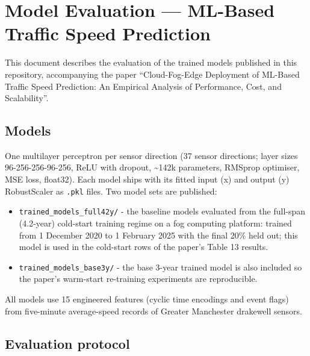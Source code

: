 \documentclass[
  10pt, ]{article}
\author{}
\date{}
\providecommand{\tightlist}{%
  \setlength{\itemsep}{0pt}\setlength{\parskip}{0pt}}
\begin{document}
\hypertarget{model-evaluation-ml-based-traffic-speed-prediction}{%
\section{Model Evaluation --- ML-Based Traffic Speed
Prediction}\label{model-evaluation-ml-based-traffic-speed-prediction}}

This document describes the evaluation of the trained models published in this repository, accompanying the paper ``Cloud-Fog-Edge Deployment of ML-Based Traffic Speed Prediction: An Empirical Analysis of Performance, Cost, and Scalability''.

\hypertarget{models}{%
\subsection{Models}\label{models}}

One multilayer perceptron per sensor direction (37 sensor directions; layer sizes 96-256-256-96-256, ReLU with dropout, \textasciitilde142k parameters, RMSprop optimiser, MSE loss, float32). Each model ships with its fitted input (x) and output (y) RobustScaler as \texttt{.pkl} files. Two model sets are published:

\begin{itemize}
\tightlist
\item
  \texttt{trained\_models\_full42y/} - the baseline models evaluated from the full-span (4.2-year) cold-start training regime on a fog computing platform: trained from 1 December 2020 to 1 February 2025 with the final 20\% held out; this model is used in the cold-start rows of the paper's Table 13 results.
\item
  \texttt{trained\_models\_base3y/} - the base 3-year trained model is also included so the paper's warm-start re-training experiments are reproducible.
\end{itemize}

All models use 15 engineered features (cyclic time encodings and event flags) from five-minute average-speed records of Greater Manchester drakewell sensors.

\hypertarget{evaluation-protocol}{%
\subsection{Evaluation protocol}\label{evaluation-protocol}}
\end{document}
